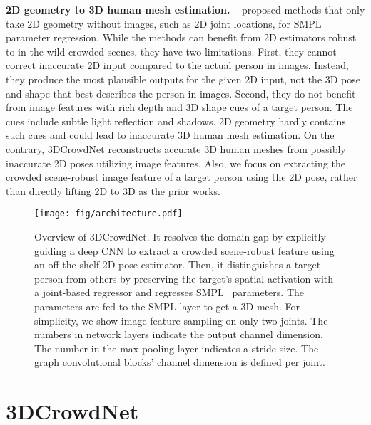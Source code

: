 \documentclass[10pt,twocolumn,letterpaper]{article}
\begin{document}
\noindent\textbf{2D geometry to 3D human mesh estimation.}
~\cite{choi2020p2m,zhang2020learning,song2020human,sengupta2020synthetic} proposed methods that only take 2D geometry without images, such as 2D joint locations, for SMPL parameter regression.
While the methods can benefit from 2D estimators robust to in-the-wild crowded scenes, they have two limitations.
First, they cannot correct inaccurate 2D input compared to the actual person in images.
Instead, they produce the most plausible outputs for the given 2D input, not the 3D pose and shape that best describes the person in images.
Second, they do not benefit from image features with rich depth and 3D shape cues of a target person.
The cues include subtle light reflection and shadows.
2D geometry hardly contains such cues and could lead to inaccurate 3D human mesh estimation. On the contrary, 3DCrowdNet reconstructs accurate 3D human meshes from possibly inaccurate 2D poses utilizing image features.
Also, we focus on extracting the crowded scene-robust image feature of a target person using the 2D pose, rather than directly lifting 2D to 3D as the prior works.











 \begin{figure*}
\begin{center}
\texttt{[image: fig/architecture.pdf]}
\end{center}
   \caption{
    Overview of 3DCrowdNet. It resolves the domain gap by explicitly guiding a deep CNN to extract a crowded scene-robust feature using an off-the-shelf 2D pose estimator. Then, it distinguishes a target person from others by preserving the target's spatial activation with a joint-based regressor and regresses SMPL~\cite{loper2015smpl} parameters. The parameters are fed to the SMPL layer to get a 3D mesh. For simplicity, we show image feature sampling on only two joints. The numbers in network layers indicate the output channel dimension. The number in the max pooling layer indicates a stride size. The graph convolutional blocks’ channel dimension is defined per joint.
   }
\label{fig:architecture}
\end{figure*}

\section{3DCrowdNet}
\end{document}
